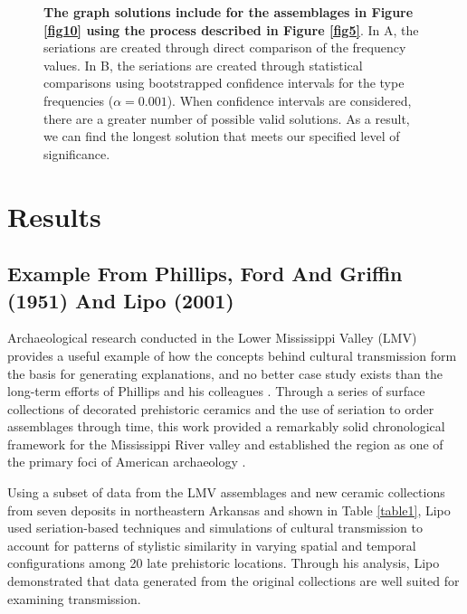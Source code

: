 \documentclass[10pt,letterpaper]{article}
\begin{document}
\begin{figure}[h]
\caption{{\bf The graph solutions include for the assemblages in Figure \ref{fig10} using the process described in Figure \ref{fig5}}. In A, the seriations are created through direct comparison of the frequency values. In B, the seriations are created through statistical comparisons using bootstrapped confidence intervals for the type frequencies ($\alpha = 0.001$). When confidence intervals are considered, there are a greater number of possible valid solutions. As a result, we can find the longest solution that meets our specified level of significance.}
\label{fig11}
\end{figure}



\section*{Results}


\subsection*{Example From Phillips, Ford And Griffin (1951) And Lipo (2001)}

Archaeological research conducted in the Lower Mississippi Valley (LMV) provides a useful example of how the concepts behind cultural transmission form the basis for generating explanations, and no better case study exists than the long-term efforts of Phillips and his colleagues \cite{Phillips1951}. Through a series of surface collections of decorated prehistoric ceramics and the use of seriation to order assemblages through time, this work provided a remarkably solid chronological framework for the Mississippi River valley and established the region as one of the primary foci of American archaeology \cite{lyman1997rise,o1998james,o1998brief}. 

Using a subset of data from the LMV assemblages and new ceramic collections from seven deposits in northeastern Arkansas \cite{Lipo1997Population,Lipo2001a} and shown in Table \ref{table1}, Lipo used seriation-based techniques and simulations of cultural transmission to account for patterns of stylistic similarity in varying spatial and temporal configurations among 20 late prehistoric locations.  Through his analysis, Lipo \cite{Lipo2001a,Lipo2008} demonstrated that data generated from the original collections are well suited for examining transmission. 
\end{document}
